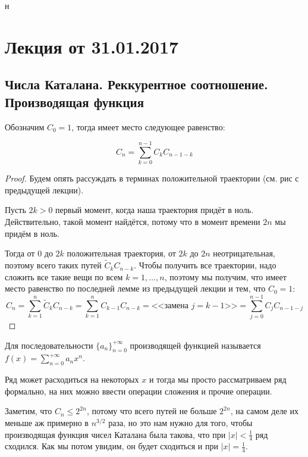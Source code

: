 н\section{Лекция от 31.01.2017}

\subsection{Числа Каталана. Реккурентное соотношение. Производящая функция}
\begin{lemma}
  Обозначим $C_0 = 1$, тогда имеет место следующее равенство:

  \[
    C_n = \sum\limits_{k = 0}^{n - 1} C_k C_{n - 1 - k}
  \]
\end{lemma}

\begin{proof}
  Будем опять рассуждать в терминах положительной траектории (см. рис с предыдущей
  лекции).

  Пусть $2k > 0$ первый момент, когда наша траектория придёт в ноль. Действительно,
  такой момент найдётся, потому что в момент времени $2n$ мы придём в ноль.

  Тогда от $0$ до $2k$ положительная траектория, от $2k$ до $2n$ неотрицательная,
  поэтому всего таких путей $\tilde{C}_{k}C_{n - k}$. Чтобы получить все траектории,
  надо сложить все такие вещи по всем $k = 1, \ldots, n$, поэтому мы получим,
  что имеет место равенство по последней лемме из предыдущей лекции и тем, что $C_0 = 1$:
  \[
    C_n = \sum\limits_{k = 1}^n \tilde{C}_{k}C_{n - k} =
    \sum\limits_{k = 1}^n C_{k - 1}C_{n - k} = \text{<<замена $j = k - 1$>>} =
    \sum\limits_{j = 0}^{n - 1} C_j C_{n - 1 - j}
  \]
\end{proof}

\begin{definition}
  Для последовательности $\{a_n\}_{n = 0}^{+\infty}$ производящей функцией называется $f(x) = \sum\limits_{n = 0}^{+\infty} a_n x^n$.
\end{definition}

Ряд может расходиться на некоторых $x$ и тогда мы просто
рассматриваем ряд формально, на них можно ввести операции сложения
и прочие операции.

Заметим, что $C_n \leq 2^{2n}$, 
потому что всего путей не больше $2^{2n}$, на самом деле их меньше
аж примерно в $n^{3/2}$ раза, но это нам нужно для того, чтобы 
производящая функция чисел Каталана была такова, что при 
$|x| < \frac{1}{4}$ ряд сходился. Как мы потом увидим, он будет 
сходиться и при $|x| = \frac{1}{4}$.


